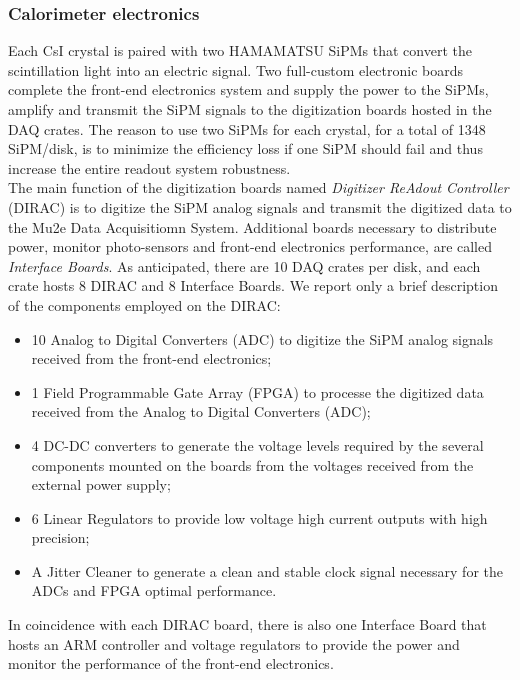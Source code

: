 \documentclass[12pt,a4paper,openright, oneside, titlepage]{book} %
\begin{document}
\subsubsection{Calorimeter electronics}
Each CsI crystal is paired with two HAMAMATSU SiPMs that convert the scintillation light
into an electric signal. 
Two full-custom electronic boards complete the front-end electronics system
and supply the power to the SiPMs, amplify and transmit the SiPM signals to the digitization boards
hosted in the DAQ crates. 
The reason to use two SiPMs for each crystal, for a total of 1348 SiPM/disk, 
is to minimize the efficiency loss if one SiPM should fail and thus increase the entire readout
system robustness.\\ 
The main function of the digitization boards named  \textit{Digitizer ReAdout Controller} (DIRAC) 
is to digitize the SiPM analog signals and transmit the digitized data to the Mu2e Data Acquisitiomn System.
Additional boards necessary to distribute power, monitor photo-sensors and front-end electronics  performance, 
are called \textit{Interface Boards}. 
As anticipated, there are 10 DAQ crates per disk, and each crate hosts 8 DIRAC and 8 Interface Boards. 
We report only a brief description of the components employed on the DIRAC:
\begin{itemize}
\item 10 Analog to Digital Converters (ADC) to  digitize the SiPM analog signals received 
from the front-end electronics;
\item 1 Field Programmable Gate Array (FPGA) to processe the digitized data received from  
the Analog to Digital Converters (ADC);
\item 4 DC-DC converters to generate the voltage levels required by the several components 
mounted on the boards from the voltages received from the external power supply; 
\item 6 Linear Regulators to provide low voltage high current outputs with high precision;
\item A Jitter Cleaner to generate a clean and stable clock signal necessary for the ADCs and FPGA optimal performance.
\end{itemize}
In coincidence with each DIRAC board, there is also one Interface Board that hosts an ARM controller 
and voltage regulators to provide the power and monitor the performance of the front-end electronics.
\end{document}
